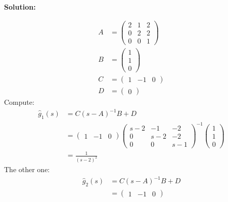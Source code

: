 \documentclass[12pt]{article}
\newenvironment{solution}{
    \textbf{Solution:}
    
}{
    
    \vspace{2em}
}
\begin{document}
\begin{solution}
    \[
        \begin{aligned}
            A &= \begin{pmatrix}
                2 & 1 & 2 \\
                0 & 2 & 2 \\
                0 & 0 & 1
            \end{pmatrix}\\
            B &= \begin{pmatrix}
                1 \\
                1 \\
                0
            \end{pmatrix}\\
            C &= \begin{pmatrix}
                1 & -1 & 0
            \end{pmatrix}\\
            D &= \begin{pmatrix}
                0
            \end{pmatrix}
        \end{aligned}
    \]
    Compute:
    \[
        \begin{aligned}
            \hat{g}_1(s) &= C(s - A)^{-1}B + D \\
            &=\begin{pmatrix}
                1 & -1 & 0
            \end{pmatrix}
            \begin{pmatrix}
                s - 2 & -1 & -2 \\
            0 & s - 2 & -2 \\
                0 & 0 & s - 1
            \end{pmatrix}^{-1}
            \begin{pmatrix}
                1 \\
                1 \\
                0
            \end{pmatrix}\\
            &= \frac{1}{(s-2)^2}
        \end{aligned}
    \]
    The other one:
    \[
        \begin{aligned}
            \hat{g}_2(s) &= C(s - A)^{-1}B + D \\
            &=\begin{pmatrix}
                1 & -1 & 0
            \end{pmatrix}

\end{aligned}\]
\end{solution}
\end{document}
